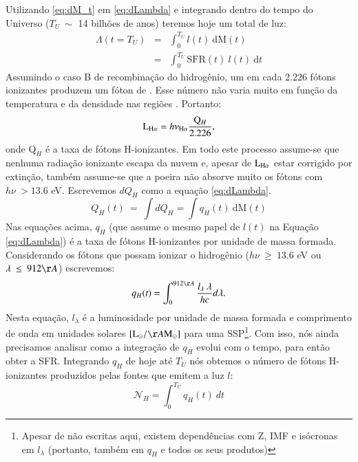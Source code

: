 Utilizando \eqref{eq:dM_t} em \eqref{eq:dLambda} e integrando dentro do tempo do Universo ($T_U\ \sim$ 14 bilhões de anos) teremos hoje um total de luz:
\begin{eqnarray}
	\Lambda(t = T_U) &=& \int_0^{T_U} l(t)\ \textrm{d}\textrm{M}(t) \\
	&=& \int_0^{T_U} \mathrm{SFR}(t)\ l(t)\ \textrm{d}t
	\label{eq:Lambda}
\end{eqnarray}
\noindent Assumindo o caso B de recombinação do hidrogênio, um em cada 2.226 fótons ionizantes produzem um fóton de \Ha \citep{Osterbrock.Ferland.2006a}. Esse número não varia muito em função da temperatura e da densidade nas regiões \Hii. Portanto:
\begin{equation}
	\LHalpha = h \nu_{\Ha} \frac{\mathrm{Q}_H}{2.226},
	\label{eq:LHa_recomb_theory}
\end{equation}
\noindent onde $\mathrm{Q}_H$ é a taxa de fótons H-ionizantes. Em todo este processo assume-se que nenhuma radiação ionizante escapa da nuvem e, apesar de $\LHalpha$ estar corrigido por extinção, também assume-se que a poeira não absorve muito os fótons com $h\nu\ > 13.6$ eV. Escrevemos $dQ_H$ como a equação \eqref{eq:dLambda}.
\begin{equation}
	Q_H(t)\ =\ \int dQ_H = \int q_H(t)\ \mathrm{d}\mathrm{M}(t)
	\label{eq:QH_t}
\end{equation}
\noindent Nas equações acima, $q_H$ (que assume o mesmo papel de $l(t)$ na Equação \ref{eq:dLambda}) é a taxa de fótons H-ionizantes por unidade de massa formada. Considerando os fótons que possam ionizar o hidrogênio ($h\nu\ \geq\ 13.6$ eV ou $\lambda\ \leq\ 912\AA$) escrevemos:
\begin{equation}
	q_H(t) = \int_0^{912\AA} \frac{l_\lambda\ \lambda}{h c} d\lambda.
	\label{eq:qH}
\end{equation}
\noindent Nesta equação, $l_\lambda$ é a luminosidade por unidade de massa formada e comprimento de onda em unidades solares $[\textrm{L}_\odot/\AA\textrm{M}_\odot]$ para uma SSP\footnote{Apesar de não escritas aqui, existem dependências com Z, IMF e isócronas em $l_\lambda$ (portanto, também em $q_H$ e todos os seus produtos)}. Com isso, nós ainda precisamos analisar como a integração de $q_H$ evolui com o tempo, para então obter a SFR. Integrando $q_H$ de hoje até $T_U$ nós obtemos o número de fótons H-ionizantes produzidos pelas fontes que emitem a luz $l$:
\begin{equation}
	\mathcal{N}_H = \int_0^{T_U} q_H(t)\ dt
	\label{eq:Nh}
\end{equation}

